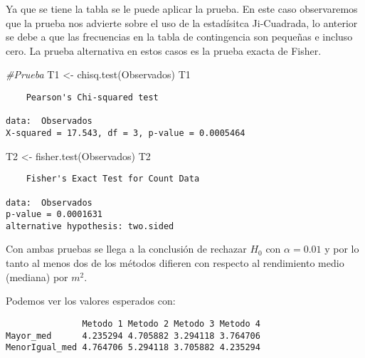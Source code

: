 \documentclass[
  a4paper,
  oneside,
  openany]{book}
\newenvironment{Shaded}{\begin{snugshade}}{\end{snugshade}}
\newcommand{\CommentTok}[1]{\textcolor[rgb]{0.56,0.35,0.01}{\textit{#1}}}
\newcommand{\FunctionTok}[1]{\textcolor[rgb]{0.00,0.00,0.00}{#1}}
\newcommand{\NormalTok}[1]{#1}
\newcommand{\OtherTok}[1]{\textcolor[rgb]{0.56,0.35,0.01}{#1}}
\newcommand{\SpecialCharTok}[1]{\textcolor[rgb]{0.00,0.00,0.00}{#1}}
\begin{document}
Ya que se tiene la tabla se le puede aplicar la prueba. En este caso observaremos que la prueba nos advierte sobre el uso de la estadísitca Ji-Cuadrada, lo anterior se debe a que las frecuencias en la tabla de contingencia son pequeñas e incluso cero. La prueba alternativa en estos casos es la prueba exacta de Fisher.

\begin{Shaded}
\begin{Highlighting}[]
\CommentTok{\#Prueba}
\NormalTok{T1 }\OtherTok{\textless{}{-}} \FunctionTok{chisq.test}\NormalTok{(Observados)}
\NormalTok{T1}
\end{Highlighting}
\end{Shaded}

\begin{verbatim}
    Pearson's Chi-squared test

data:  Observados
X-squared = 17.543, df = 3, p-value = 0.0005464
\end{verbatim}

\begin{Shaded}
\begin{Highlighting}[]
\NormalTok{T2 }\OtherTok{\textless{}{-}} \FunctionTok{fisher.test}\NormalTok{(Observados)}
\NormalTok{T2}
\end{Highlighting}
\end{Shaded}

\begin{verbatim}
    Fisher's Exact Test for Count Data

data:  Observados
p-value = 0.0001631
alternative hypothesis: two.sided
\end{verbatim}

Con ambas pruebas se llega a la conclusión de rechazar \(H_0\) con \(\alpha=0.01\) y por lo tanto al menos dos de los métodos difieren con respecto al rendimiento medio (mediana) por \(m^2\).

Podemos ver los valores esperados con:

\begin{Shaded}
\end{Shaded}

\begin{verbatim}
               Metodo 1 Metodo 2 Metodo 3 Metodo 4
Mayor_med      4.235294 4.705882 3.294118 3.764706
MenorIgual_med 4.764706 5.294118 3.705882 4.235294
\end{verbatim}
\end{document}
